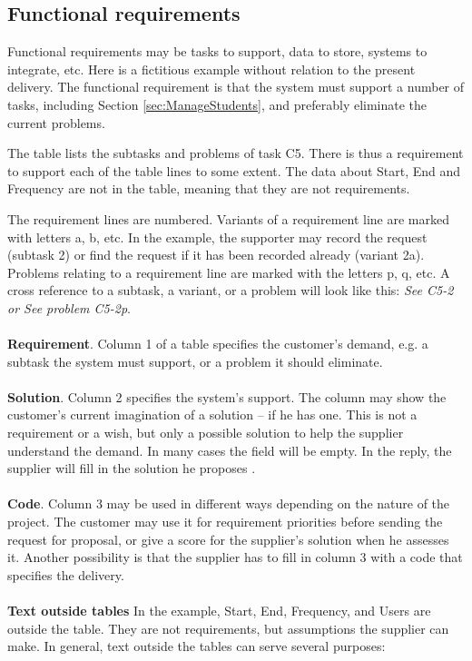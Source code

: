\documentclass[Main]{subfiles}
\begin{document}
\subsection{Functional requirements}

Functional requirements may be tasks to support, data to store, systems to integrate, etc. 
Here is a fictitious example without relation to the present delivery. 
The functional requirement is that the system must support a number of tasks, including Section \ref{sec:ManageStudents}, and preferably eliminate the current problems.



The table lists the subtasks and problems of task C5. 
There is thus a requirement to support each of the table lines to some extent. 
The data about Start, End and Frequency are not in the table, meaning that they are not requirements.

The requirement lines are numbered. 
Variants of a requirement line are marked with letters a, b, etc. 
In the example, the supporter may record the request (subtask 2) or find the request if it has been recorded already (variant 2a). 
Problems relating to a requirement line are marked with the letters p, q, etc. 
A cross reference to a subtask, a variant, or a problem will look like this:
	\textit{See C5-2 or See problem C5-2p}.
\\
\\
\textbf{Requirement}. 
Column 1 of a table specifies the customer's demand, e.g. a subtask the system must support, or a problem it should eliminate. 
\\
\\
\textbf{Solution}. 
Column 2 specifies the system's support. 
The column may show the customer's current imagination of a solution -- if he has one. 
This is not a requirement or a wish, but only a possible solution to help the supplier understand the demand. 
In many cases the field will be empty. 
In the reply, the supplier will fill in the solution he proposes .
\\
\\
\textbf{Code}. 
Column 3 may be used in different ways depending on the nature of the project. 
The customer may use it for requirement priorities before sending the request for proposal, or give a score for the supplier's solution when he assesses it. 
Another possibility is that the supplier has to fill in column 3 with a code that specifies the delivery.
\\
\\
\textbf{Text outside tables}
In the example, Start, End, Frequency, and Users are outside the table. 
They are not requirements, but assumptions the supplier can make. 
In general, text outside the tables can serve several purposes:
\end{document}
